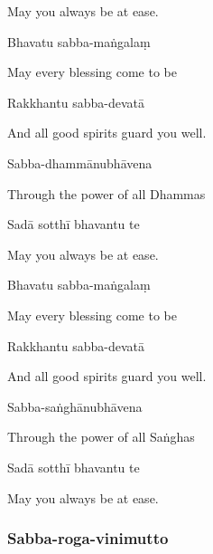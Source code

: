 \begin{english}
  May you always be at ease.
\end{english}

Bhavatu sabba-maṅgalaṃ

\begin{english}
  May every blessing come to be
\end{english}

Rakkhantu sabba-devatā

\begin{english}
  And all good spirits guard you well.
\end{english}

Sabba-dhammānubhāvena

\begin{english}
  Through the power of all Dhammas
\end{english}

Sadā sotthī bhavantu te

\begin{english}
  May you always be at ease.
\end{english}

Bhavatu sabba-maṅgalaṃ

\begin{english}
  May every blessing come to be
\end{english}

Rakkhantu sabba-devatā

\begin{english}
  And all good spirits guard you well.
\end{english}

Sabba-saṅghānubhāvena

\begin{english}
  Through the power of all Saṅghas
\end{english}

Sadā sotthī bhavantu te

\begin{english}
  May you always be at ease.
\end{english}

\subsubsection{Sabba-roga-vinimutto}



\bigskip

